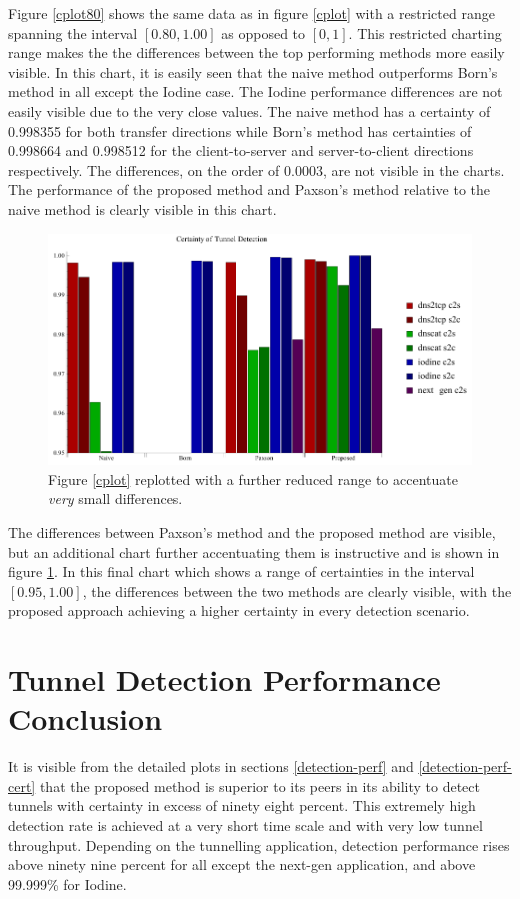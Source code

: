 \documentclass[12pt]{report}
\theoremstyle{remark}
\theoremstyle{definition}
\theoremstyle{definition}
\theoremstyle{definition}
\begin{document}
Figure \ref{cplot80} shows the same data as in figure \ref{cplot} with a
restricted range spanning the interval $[0.80,1.00]$ as opposed to $[0,1]$. This
restricted charting range makes the the differences between the top performing
methods more easily visible. In this chart, it is easily seen that the naive
method outperforms Born's method in all except the Iodine case. The Iodine
performance differences are not easily visible due to the very close values. The
naive method has a certainty of 0.998355 for both transfer directions while
Born's method has certainties of 0.998664 and 0.998512 for the client-to-server
and server-to-client directions respectively. The differences, on the order of
0.0003, are not visible in the charts. The performance of the proposed method
and Paxson's method relative to the naive method is clearly visible in this
chart.

\begin{figure}
\centering
\includegraphics[width=\textwidth]{figures/cplot3.pdf}
\caption[Chart of Certainty of Detection by Tunnel Application and Detection
Method - 0.95 to 1.00]{Figure \ref{cplot} replotted with a further reduced range to
accentuate \emph{very} small differences.}
\label{cplot95}
\end{figure}

The differences between Paxson's method and the proposed method are visible, but
an additional chart further accentuating them is instructive and is shown in
figure \ref{cplot95}. In this final chart which shows a range of certainties in
the interval $[0.95,1.00]$, the differences between the two methods are clearly
visible, with the proposed approach achieving a higher certainty in every
detection scenario.

\section{Tunnel Detection Performance Conclusion}
It is visible from the detailed plots in sections \ref{detection-perf} and
\ref{detection-perf-cert} that the proposed method is superior to its peers in
its ability to detect tunnels with certainty in excess of ninety eight percent.
This extremely high detection rate is achieved at a very short time scale and
with very low tunnel throughput. Depending on the tunnelling application,
detection performance rises above ninety nine percent for all except the
next-gen application, and above 99.999\% for Iodine.
\end{document}
